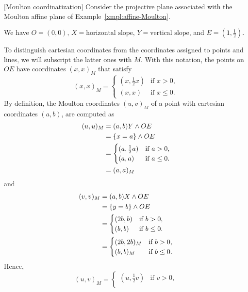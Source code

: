 \begin{xmpl}\label{xmpl:Moulton-coordinatization} [Moulton coordinatization]
    Consider the projective plane associated with the Moulton affine plane of Example~\ref{xmpl:affine-Moulton}.

    We have $O=(0,0)$, $X=\text{horizontal slope}$, $Y=\text{vertical slope}$, and $E=(1,\frac12)$.

    To distinguish cartesian coordinates from the coordinates assigned to points and lines, we will subscript the latter ones with $M$. With this notation, the points on $OE$ have coordinates $(x,x)_M$ that satisfy
    \[
        (x,x)_M=\begin{cases}
            (x,\frac12x) &\text{if }x>0,\\
            (x,x) &\text{if }x\le0.
        \end{cases}
    \]
    By definition, the Moulton coordinates $(u,v)_M$ of a point with cartesian coordinates $(a,b)$, are computed as
    \begin{align*}
        (u,u)_M &= (a,b)Y\wedge OE\\
            &= \{x=a\}\wedge OE\\
            &= \begin{cases}
                    (a,\frac12a)    &\text{if }a>0,\\
                    (a,a)   &\text{if }a\le0.
                \end{cases}\\
            &= (a,a)_M
    \end{align*}
    and
    \begin{align*}
        (v,v)_M &= (a,b)X\wedge OE\\
            &= \{y=b\}\wedge OE\\
            &= \begin{cases}
                    (2b,b)    &\text{if }b>0,\\
                    (b,b)   &\text{if }b\le0.
                \end{cases}\\
            &= \begin{cases}
                (2b,2b)_M   &\text{if }b>0,\\
                (b,b)_M       &\text{if }b\le0.
            \end{cases}
    \end{align*}
    Hence,
    \[
        (u,v)_M = \begin{cases}
            (u,\frac12v)  &\text{if }v>0,\\

\end{cases}\]
\end{xmpl}
